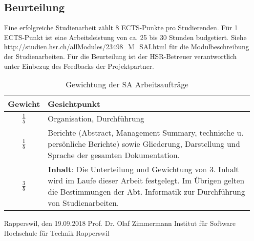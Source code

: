 \subsection{Beurteilung}
Eine erfolgreiche Studienarbeit zählt 8 ECTS-Punkte pro Studierenden. Für 1 ECTS-Punkt ist eine Arbeitsleistung von ca. 25 bis 30 Stunden budgetiert. 
Siehe \url{http://studien.hsr.ch/allModules/23498_M_SAI.html} für die Modulbeschreibung der Studienarbeiten.
Für die Beurteilung ist der HSR-Betreuer verantwortlich unter Einbezug des Feedbacks der Projektpartner.
 \begin{table}
    \begin{tabularx}{\textwidth}{|c|X|}
        \hline 
        Gewicht & Gesichtpunkt \\
        \hline 
        \( \frac{1}{5} \) & Organisation, Durchführung \\ 
        \hline 
        \( \frac{1}{5} \) &  Berichte (Abstract, Management Summary, technische u. persönliche Berichte) sowie Gliederung, Darstellung und Sprache der gesamten Dokumentation. \\ 
        \hline 
        \( \frac{3}{5} \) & \textbf{Inhalt}: Die Unterteilung und Gewichtung von 3. Inhalt wird im Laufe dieser Arbeit festgelegt.
        Im Übrigen gelten die Bestimmungen der Abt. Informatik zur Durchführung von Studienarbeiten.\\
        \hline 
    \end{tabularx}
    \caption{Gewichtung der SA Arbeitsaufträge}
\end{table}
 Rapperswil, den 19.09.2018
 Prof. Dr. Olaf Zimmermann
Institut für Software
Hochschule für Technik Rapperswil